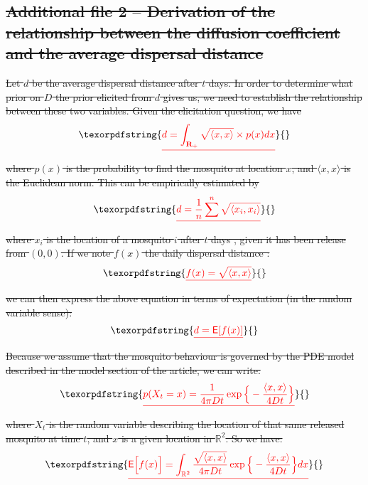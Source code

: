 \documentclass[]{bmcart}
\providecommand{\DIFdeltex}[1]{{\protect\color{red}\sout{#1}}}                      %
\providecommand{\DIFdel}[1]{\texorpdfstring{\DIFdeltex{#1}}{}} %
\begin{document}
\begin{backmatter}
\subsection{\DIFdel{Additional file 2 -- Derivation of the relationship between the diffusion coefficient and the average dispersal distance}}
\addtocounter{subsection}{-1}%
\DIFdel{Let $d$ be the average dispersal distance after $t$ days. In order to determine what prior on $D$ the prior elicited from $d$ gives us, we need to establish the relationship between these two variables. Given the elicitation question, we have 
}\begin{displaymath} \DIFdel{d = \int_{\mathbf{R}_{+}}  \sqrt{\langle x, x  \rangle} \times p(x) dx}\end{displaymath}%
\DIFdel{where $p(x)$ is the probability to find the mosquito at location $x$, and $\langle x, x  \rangle$ is the Euclidean norm. This can be empirically estimated by 
}\begin{displaymath} \DIFdel{d = \frac{1}{n}\sum^n  \sqrt{\langle x_i, x_i  \rangle}}\end{displaymath}%
\DIFdel{where $x_i$ is the location of a mosquito $i$ after $t$ days , given it has been release from $(0,0)$. If we note  $f(x)$ the daily dispersal distance :
}\begin{displaymath} \DIFdel{f(x) = \sqrt{\langle x, x  \rangle} }\end{displaymath}%
\DIFdel{we can then express the above equation in terms of expectation (in the random variable sense): 
}\begin{displaymath}\DIFdel{d = \mathsf{E}[ f(x)]}\end{displaymath}%
\DIFdel{Because we assume that the mosquito behaviour is governed by the PDE model described in the model section of the article, we can write:
}\begin{displaymath}\DIFdel{p(X_t = x) = \frac{1}{4 \pi D t} \exp\Big\{-\frac{\langle x, x  \rangle}{4 D t}\Big\}}\end{displaymath}%
\DIFdel{where $X_t$ is the random variable describing the location of that same released mosquito at time $t$, and $x$ is a given location in $\mathbb{R}^2$. 
So we have:
}\begin{displaymath} \DIFdel{\mathsf{E} \Big[ f(x) \Big] = \int_{\mathbb{R}^2} \frac{\sqrt{\langle x, x  \rangle}}{4 \pi D t} \exp\Big\{-\frac{\langle x, x  \rangle}{4 D t}\Big\} dx }\end{displaymath}%

\end{backmatter}
\end{document}

